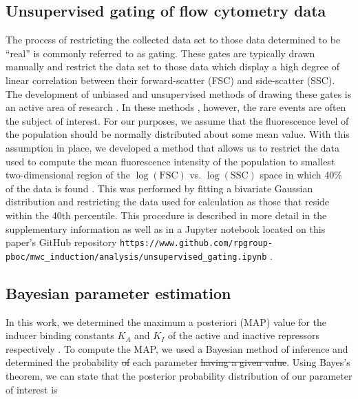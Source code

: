 \subsection*{Unsupervised gating of flow cytometry data}
The process of restricting the collected data set to those data determined to
be ``real'' is commonly referred to as gating. These gates are typically drawn
manually \cite{Maecker2005} and restrict the data set to those data  which
display a high degree of linear correlation  between their forward-scatter
(FSC) and side-scatter (SSC). The development of unbiased and unsupervised
methods of drawing these gates is an active area of research
\cite{Agaheepour2013, Lo2008}. In these methods , however, the rare events are
often the subject of interest. For our purposes, we assume that the
fluorescence level of the population should be normally distributed about some
mean value. With this  assumption in place, we developed a method that allows
us to restrict the data used  to compute the mean fluorescence intensity of the
population to smallest two-dimensional  region of the $\log(\mathrm{FSC})$ vs.
$\log(\mathrm{SSC})$ space in which 40\% of the data is found . This  was
performed by fitting a bivariate Gaussian distribution and restricting the
data used for calculation as those that reside within the 40th percentile.
 This procedure is  described in
more detail in the supplementary information as well as in a  Jupyter notebook
located on this paper's GitHub repository
\texttt{https://www.github.com/rpgroup-pboc/mwc\_induction/analysis/unsupervised\_gating.ipynb} .

\subsection*{Bayesian parameter estimation}
In this work, we determined the maximum a posteriori (MAP) value for
the inducer binding constants $K_A$ and $K_I$ of the active and inactive
repressors respectively . To compute the MAP, we used a Bayesian method of
inference and determined the probability  \sout{of} each parameter \sout{having a given
value}. Using Bayes's theorem, we can state that the posterior probability
distribution of our parameter of interest is

